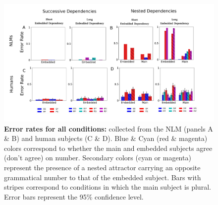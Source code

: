 \begin{landscape}
\begin{figure}
    \centering
    \includegraphics[width=\linewidth]{figures/SM/error_rates_all_conditions.png}
    \caption{\textbf{Error rates for all conditions:} collected from the NLM (panels A \& B) and human subjects (C \& D). Blue \& Cyan (red \& magenta) colors correspond to whether the main and embedded subjects agree (don't agree) on number. Secondary colors (cyan or magenta) represent the presence of a nested attractor carrying an opposite grammatical number to that of the embedded subject. Bars with stripes correspond to conditions in which the main subject is plural. Error bars represent the 95\% confidence level.}
    \label{fig:error_rates_all_conditions}
\end{figure}
\end{landscape}

